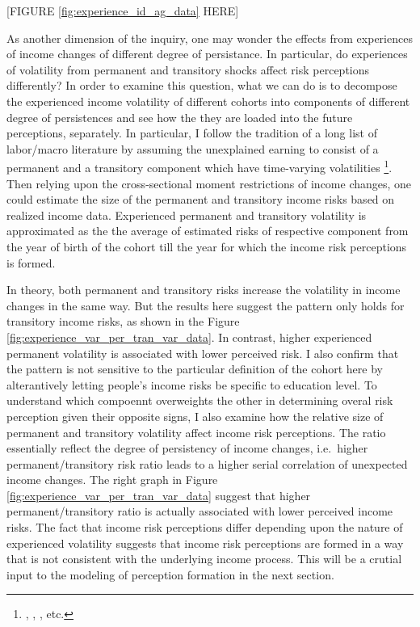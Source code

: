 \documentclass[12pt,notitlepage,onecolumn,aps,pra]{article}
\begin{document}
\begin{center}
[FIGURE \ref{fig:experience_id_ag_data} HERE]
\end{center}

As another dimension of the inquiry, one may wonder the effects from
experiences of income changes of different degree of persistance. In
particular, do experiences of volatility from permanent and transitory
shocks affect risk perceptions differently? In order to examine this
question, what we can do is to decompose the experienced income
volatility of different cohorts into components of different degree of
persistences and see how the they are loaded into the future
perceptions, separately. In particular, I follow the tradition of a long
list of labor/macro literature by assuming the unexplained earning to
consist of a permanent and a transitory component which have
time-varying volatilities
\footnote{\cite{gottschalk1994growth}, \cite{carroll1997nature}, \cite{meghir2004income}, etc.}.
Then relying upon the cross-sectional moment restrictions of income
changes, one could estimate the size of the permanent and transitory
income risks based on realized income data. Experienced permanent and
transitory volatility is approximated as the the average of estimated
risks of respective component from the year of birth of the cohort till
the year for which the income risk perceptions is formed.

In theory, both permanent and transitory risks increase the volatility
in income changes in the same way. But the results here suggest the
pattern only holds for transitory income risks, as shown in the Figure
\ref{fig:experience_var_per_tran_var_data}. In contrast, higher
experienced permanent volatility is associated with lower perceived
risk. I also confirm that the pattern is not sensitive to the particular
definition of the cohort here by alterantively letting people's income
risks be specific to education level. To understand which compoennt
overweights the other in determining overal risk perception given their
opposite signs, I also examine how the relative size of permanent and
transitory volatility affect income risk perceptions. The ratio
essentially reflect the degree of persistency of income changes,
i.e.~higher permanent/transitory risk ratio leads to a higher serial
correlation of unexpected income changes. The right graph in Figure
\ref{fig:experience_var_per_tran_var_data} suggest that higher
permanent/transitory ratio is actually associated with lower perceived
income risks. The fact that income risk perceptions differ depending
upon the nature of experienced volatility suggests that income risk
perceptions are formed in a way that is not consistent with the
underlying income process. This will be a crutial input to the modeling
of perception formation in the next section.
\end{document}
